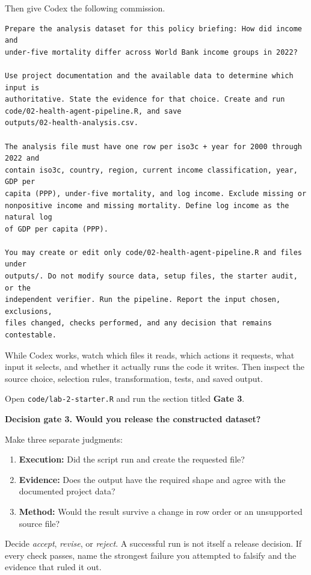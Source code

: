 \documentclass[11pt]{article}
\newcommand{\gate}[2]{\medskip\noindent\textbf{Decision gate #1. #2}\par}
\newcommand{\file}[1]{\nolinkurl{#1}}
\begin{document}
Then give Codex the following commission.

\begin{lstlisting}
Prepare the analysis dataset for this policy briefing: How did income and
under-five mortality differ across World Bank income groups in 2022?

Use project documentation and the available data to determine which input is
authoritative. State the evidence for that choice. Create and run
code/02-health-agent-pipeline.R, and save
outputs/02-health-analysis.csv.

The analysis file must have one row per iso3c + year for 2000 through 2022 and
contain iso3c, country, region, current income classification, year, GDP per
capita (PPP), under-five mortality, and log income. Exclude missing or
nonpositive income and missing mortality. Define log income as the natural log
of GDP per capita (PPP).

You may create or edit only code/02-health-agent-pipeline.R and files under
outputs/. Do not modify source data, setup files, the starter audit, or the
independent verifier. Run the pipeline. Report the input chosen, exclusions,
files changed, checks performed, and any decision that remains contestable.
\end{lstlisting}

While Codex works, watch which files it reads, which actions it requests, what
input it selects, and whether it actually runs the code it writes. Then inspect
the source choice, selection rules, transformation, tests, and saved output.

Open \file{code/lab-2-starter.R} and run the section titled \textbf{Gate 3}.

\gate{3}{Would you release the constructed dataset?}

Make three separate judgments:

\begin{enumerate}
  \item \textbf{Execution:} Did the script run and create the requested file?
  \item \textbf{Evidence:} Does the output have the required shape and agree
  with the documented project data?
  \item \textbf{Method:} Would the result survive a change in row order or an
  unsupported source file?
\end{enumerate}

Decide \emph{accept}, \emph{revise}, or \emph{reject}. A successful run is not
itself a release decision. If every check passes, name the strongest failure
you attempted to falsify and the evidence that ruled it out.
\end{document}
